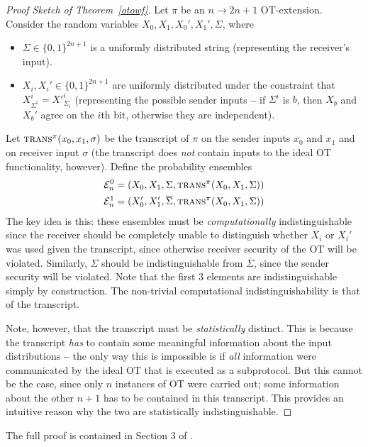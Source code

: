\begin{proof}[Proof Sketch of Theorem~\ref{otowf}]
	Let $\pi$ be an $n\rightarrow 2n+1$ OT-extension.
	Consider the random variables $X_0, X_1, X_0', X_1',\Sigma$, where
	\begin{itemize}
		\item $\Sigma\in\{0,1\}^{2n+1}$ is a uniformly distributed string (representing the receiver's input).
		\item $X_i, X_i'\in\{0,1\}^{2n+1}$ are uniformly distributed under the constraint that $X^i_{\Sigma^i}={X'}^i_{\Sigma_i}$ (representing the possible sender inputs \textbf{--} if $\Sigma^i$ is $b$, then $X_b$ and $X_b'$ agree on the $i$th bit, otherwise they are independent).
	\end{itemize}
	Let $\textsc{trans}^\pi(x_0,x_1,\sigma)$ be the transcript of $\pi$ on the sender inputs $x_0$ and $x_1$ and on receiver input $\sigma$ (the transcript does \textit{not} contain inputs to the ideal OT functionality, however). Define the probability ensembles
	\begin{align*}
		\mathcal{E}^0_n &= (X_0, X_1, \Sigma,\textsc{trans}^\pi(X_0,X_1,\Sigma))\\
		\mathcal{E}^1_n &= (X_0', X_1', \overline{\Sigma},\textsc{trans}^\pi(X_0,X_1,\Sigma))
	\end{align*}
	The key idea is this: these ensembles must be \textit{computationally} indistinguishable since the receiver should be completely unable to distinguish whether $X_i$ or $X_i'$ was used given the transcript, since otherwise receiver security of the OT will be violated. Similarly, $\Sigma$ should be indistinguishable from $\overline{\Sigma}$, since the sender security will be violated. Note that the first 3 elements are indistinguishable simply by construction. The non-trivial computational indistinguishability is that of the transcript.
	
	Note, however, that the transcript must be \textit{statistically} distinct. This is because the transcript \textit{has} to contain some meaningful information about the input distributions \textbf{--} the only way this is impossible is if \textit{all} information were communicated by the ideal OT that is executed as a subprotocol. But this cannot be the case, since only $n$ instances of OT were carried out; some information about the other $n+1$ has to be contained in this transcript. This provides an intuitive reason why the two are statistically indistinguishable.
\end{proof}

The full proof is contained in Section 3 of \cite{lindell2013feasibility}.

